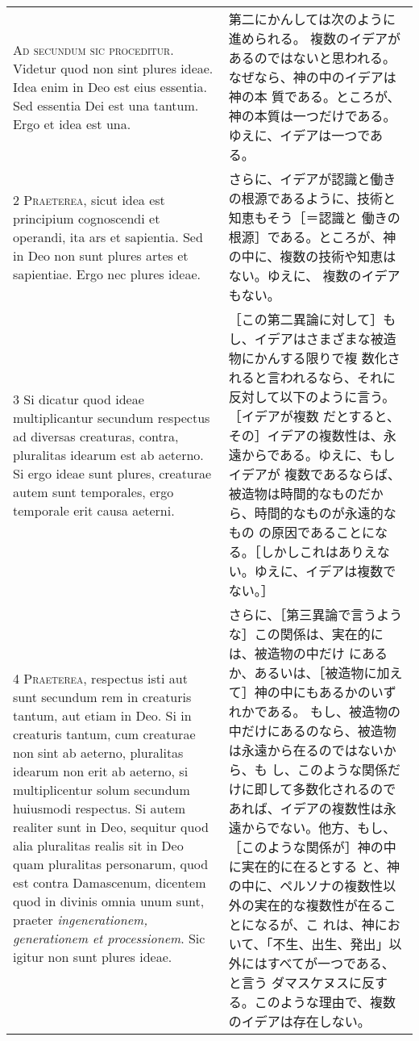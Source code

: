 \documentclass[10pt]{jsarticle} %
\begin{document}
\begin{longtable}{p{21em}p{21em}}


{\huge A}{\scshape d secundum sic proceditur}. Videtur quod
non sint plures ideae. Idea enim in Deo est eius essentia. Sed essentia
Dei est una tantum. Ergo et idea est una.

&
第二にかんしては次のように進められる。
複数のイデアがあるのではないと思われる。なぜなら、神の中のイデアは神の本
 質である。ところが、神の本質は一つだけである。ゆえに、イデアは一つであ
 る。

\\


{\scshape 2 Praeterea}, sicut idea est principium
cognoscendi et operandi, ita ars et sapientia. Sed in Deo non sunt
plures artes et sapientiae. Ergo nec plures ideae.

&

さらに、イデアが認識と働きの根源であるように、技術と知恵もそう［＝認識と
 働きの根源］である。ところが、神の中に、複数の技術や知恵はない。ゆえに、
 複数のイデアもない。

\\


3 Si dicatur quod ideae multiplicantur
secundum respectus ad diversas creaturas, contra, pluralitas idearum est
ab aeterno. Si ergo ideae sunt plures, creaturae autem sunt temporales,
ergo temporale erit causa aeterni.

&

［この第二異論に対して］もし、イデアはさまざまな被造物にかんする限りで複
 数化されると言われるなら、それに反対して以下のように言う。［イデアが複数
 だとすると、その］イデアの複数性は、永遠からである。ゆえに、もしイデアが
 複数であるならば、被造物は時間的なものだから、時間的なものが永遠的なもの
 の原因であることになる。［しかしこれはありえない。ゆえに、イデアは複数で
 ない。］

\\


{\scshape 4 Praeterea}, respectus isti aut sunt secundum
rem in creaturis tantum, aut etiam in Deo. Si in creaturis tantum, cum
creaturae non sint ab aeterno, pluralitas idearum non erit ab aeterno,
si multiplicentur solum secundum huiusmodi respectus. Si autem realiter
sunt in Deo, sequitur quod alia pluralitas realis sit in Deo quam
pluralitas personarum, quod est contra Damascenum, dicentem quod in
divinis omnia unum sunt, praeter {\itshape ingenerationem, generationem et
processionem}. Sic igitur non sunt plures ideae.

& さらに、［第三異論で言うような］この関係は、実在的には、被造物の中だけ
にあるか、あるいは、［被造物に加えて］神の中にもあるかのいずれかである。
もし、被造物の中だけにあるのなら、被造物は永遠から在るのではないから、も
し、このような関係だけに即して多数化されるのであれば、イデアの複数性は永
遠からでない。他方、もし、［このような関係が］神の中に実在的に在るとする
と、神の中に、ペルソナの複数性以外の実在的な複数性が在ることになるが、こ
れは、神において、「不生、出生、発出」以外にはすべてが一つである、と言う
ダマスケヌスに反する。このような理由で、複数のイデアは存在しない。


\end{longtable}
\end{document}
